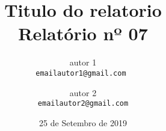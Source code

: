 \title{Titulo do relatorio \\ \large Relatório nº 07}

\author{
    autor 1 \\
    {\color{blue}\texttt{emailautor1@gmail.com }} \and
    autor 2 \\ 
    {\color{blue}\texttt{emailautor2@gmail.com}}
}

\date{25 de Setembro de 2019}

\maketitle
